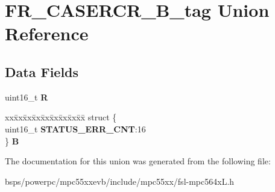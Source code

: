 \hypertarget{unionFR__CASERCR__16B__tag}{}\section{F\+R\+\_\+\+C\+A\+S\+E\+R\+C\+R\+\_\+B\+\_\+tag Union Reference}
\label{unionFR__CASERCR__16B__tag}
\subsection*{Data Fields}
\begin{DoxyCompactItemize}
\item 
\mbox{\label{unionFR__CASERCR__16B__tag_a95b2ca76b402a20d0bb1a97643af9190}} 
uint16\+\_\+t {\bfseries R}
\item 
\mbox{\label{unionFR__CASERCR__16B__tag_a04c7aa09d01e1c3368ba9d396e4ead54}} 
\begin{tabbing}
xx\=xx\=xx\=xx\=xx\=xx\=xx\=xx\=xx\=\kill
struct \{\\
\>uint16\_t {\bfseries STATUS\_ERR\_CNT}:16\\
\} {\bfseries B}\\

\end{tabbing}\end{DoxyCompactItemize}


The documentation for this union was generated from the following file\+:\begin{DoxyCompactItemize}
\item 
bsps/powerpc/mpc55xxevb/include/mpc55xx/fsl-\/mpc564x\+L.\+h\end{DoxyCompactItemize}
